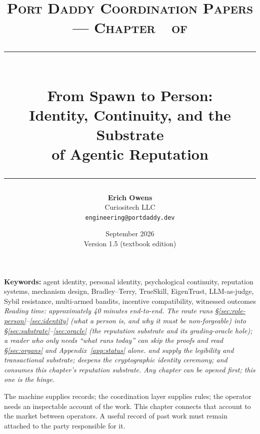 \documentclass[11pt,a4paper]{article}
\title{
  \vspace{-1cm}
  {\Large\textsc{Port Daddy Coordination Papers --- Chapter~\pdchapternumber\ of \pdchaptercount}}\\[
0.5cm]
  \rule{\textwidth}{0.5pt}\\[0.3cm]
  {\LARGE\textbf{From Spawn to Person:}}\\[0.2cm]
  {\Large Identity, Continuity, and the Substrate\\of Agentic Reputation}\\[0.3cm]
  \rule{\textwidth}{0.5pt}
}
\author{
  \textbf{Erich Owens}\\[0.2cm]
  Curiositech LLC\\[0.2cm]
  \texttt{engineering@portdaddy.dev}
}
\date{September 2026\\Version 1.5 (textbook edition)}
\theoremstyle{definition}
\begin{document}
\pdopensolutions
\maketitle
\thispagestyle{empty}
\vspace{0.6cm}
\vspace{0.5cm}
\noindent\textbf{Keywords:} agent identity, personal identity, psychological
continuity, reputation systems, mechanism design, Bradley--Terry, TrueSkill,
EigenTrust, LLM-as-judge, Sybil resistance, multi-armed bandits, incentive
compatibility, witnessed outcomes
\vspace{0.4cm}
\noindent\textit{Reading time: approximately 40 minutes end-to-end. The route
runs \S\ref{sec:role-person}--\ref{sec:identity} (what a person is, and why it
must be non-forgeable) into \S\ref{sec:substrate}--\ref{sec:oracle} (the
reputation substrate and its grading-oracle hole); a reader who only needs
``what runs today'' can skip the proofs and read \S\ref{sec:organs} and
Appendix~\ref{app:status} alone. 
and  supply the legibility and
transactional substrate;  deepens the
cryptographic identity ceremony; and 
consumes this chapter's reputation substrate. Any chapter can be opened first;
this one is the hinge.}
\vspace{0.3cm}
\noindent{}
\tableofcontents
\newpage
\ifpdmargincolumn
{}
\fi
The machine supplies records; the coordination layer supplies rules; the
operator needs an inspectable account of the work. This chapter connects
that account to the market between operators. A useful record of past work
must remain attached to the party responsible for it.
\end{document}
